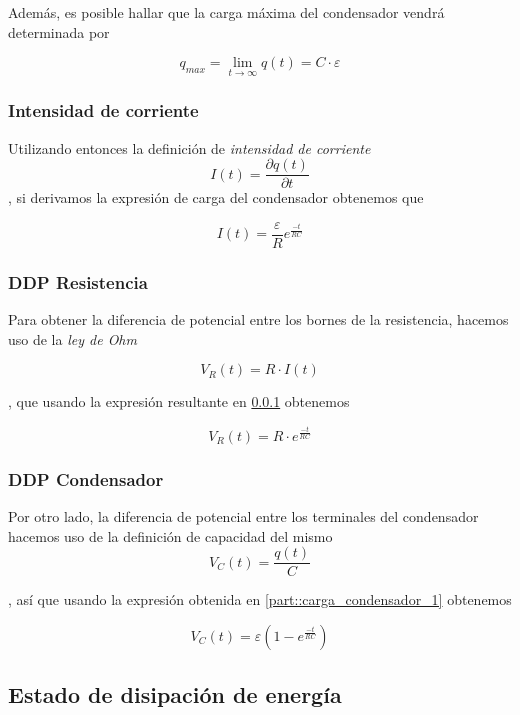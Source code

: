 \documentclass[../main.tex]{subfiles}
\begin{document}
Además, es posible hallar que la carga máxima del condensador vendrá determinada por 

$$q_{max} = \lim_{t \to \infty} q(t) = C \cdot \varepsilon$$

\subsubsection{Intensidad de corriente}
\label{part::carga_condensador_2}
Utilizando entonces la definición de \textit{intensidad de corriente}
$$I(t) = \frac{\partial q(t)}{ \partial t}$$, si derivamos la expresión de carga del condensador obtenemos que

\begin{equation}
    I(t) = \frac{\varepsilon}{R} e^{\frac{-t}{RC}}
\end{equation}

\subsubsection{DDP Resistencia}
\label{part::carga_condensador_3}
Para obtener la diferencia de potencial entre los bornes de la resistencia, hacemos uso de la \textit{ley de Ohm}

$$V_R(t) = R \cdot I(t)$$

, que usando la expresión resultante en \ref{part::carga_condensador_2} obtenemos

\begin{equation}
    V_R(t) = R \cdot e^{\frac{-t}{RC}}
\end{equation}

\subsubsection{DDP Condensador}
\label{part::carga_condensador_4}
Por otro lado, la diferencia de potencial entre los terminales del condensador hacemos uso de la definición de capacidad del mismo 
$$V_C(t) = \frac{q(t)}{C}$$

, así que usando la expresión obtenida en \ref{part::carga_condensador_1} obtenemos

\begin{equation}
    V_C(t) = \varepsilon \left( 1- e^{\frac{-t}{RC}}\right)
\end{equation}



\subsection{Estado de disipación de energía}
\end{document}
